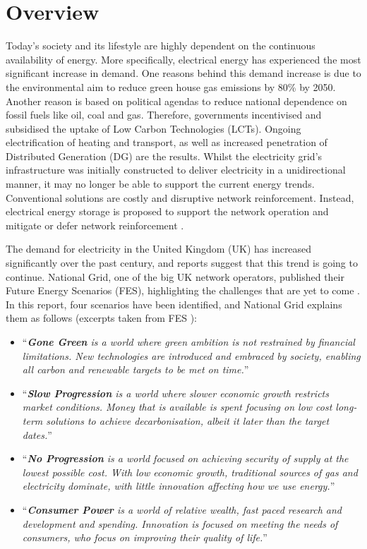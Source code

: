\section{Overview}
\label{ch-introduction:sec:overview}

Today's society and its lifestyle are highly dependent on the continuous availability of energy.
More specifically, electrical energy has experienced the most significant increase in demand.
One reasons behind this demand increase is due to the environmental aim to reduce green house gas emissions by 80\% by 2050.
Another reason is based on political agendas to reduce national dependence on fossil fuels like oil, coal and gas.
Therefore, governments incentivised and subsidised the uptake of Low Carbon Technologies (LCTs).
Ongoing electrification of heating and transport, as well as increased penetration of Distributed Generation (DG) are the results.
Whilst the electricity grid's infrastructure was initially constructed to deliver electricity in a unidirectional manner, it may no longer be able to support the current energy trends.
Conventional solutions are costly and disruptive network reinforcement.
Instead, electrical energy storage is proposed to support the network operation and mitigate or defer network reinforcement \cite{Manz2012, Kleinberg2014}.

The demand for electricity in the United Kingdom (UK) has increased significantly over the past century, and reports suggest that this trend is going to continue.
National Grid, one of the big UK network operators, published their Future Energy Scenarios (FES), highlighting the challenges that are yet to come \cite{FES2015}.
In this report, four scenarios have been identified, and National Grid explains them as follows (excerpts taken from FES \cite{FES2015}):

\begin{itemize}
	\item ``\textit{\textbf{Gone Green} is a world where green ambition is not restrained by financial limitations. New technologies are introduced and embraced by society, enabling all carbon and renewable targets to be met on time.}''
	\item ``\textit{\textbf{Slow Progression} is a world where slower economic growth restricts market conditions. Money that is available is spent focusing on low cost long-term solutions to achieve decarbonisation, albeit it later than the target dates.}''
	\item ``\textit{\textbf{No Progression} is a world focused on achieving security of supply at the lowest possible cost. With low economic growth, traditional sources of gas and electricity dominate, with little innovation affecting how we use energy.}''
	\item ``\textit{\textbf{Consumer Power} is a world of relative wealth, fast paced research and development and spending. Innovation is focused on meeting the needs of consumers, who focus on improving their quality of life.}''
\end{itemize}

